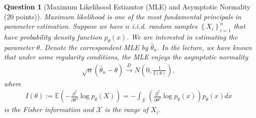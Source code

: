 \documentclass[11pt]{article}
\theoremstyle{mytheoremstyle}
\newtheorem{question}{Question}
\begin{document}
\begin{question}[Maximum Likelihood Estiamtor (MLE) and Asymptotic Normality (20 points)]
Maximum likelihood is one of the most fundamental principals in parameter estimation. Suppose we have $n$ i.i.d. random samples $\left\{X_i\right\}_{i=1}^n$ that have probability density function $p_\theta(x)$. We are interested in estimating the parameter $\theta$. Denote the correspondent MLE by $\hat \theta_n$. In the lecture, we have known that under some regularity conditions, the MLE enjoys the asymptotic normality
\begin{align}
\sqrt n (\hat \theta_n-\theta)\overset{D}\longrightarrow N(0,\frac{1}{I(\theta)}),
\end{align}
where
\begin{align*}
I(\theta):=\mathbb{E}\left(-\frac{\partial^2}{\partial \theta^2}\log p_\theta(X)\right)
=-\int_{\mathcal X}\left(\frac{\partial^2}{\partial \theta^2}\log p_\theta(x)\right)p_\theta(x)dx
\end{align*}
is the Fisher information and $\mathcal{X}$ is the range of $X_i$.
\end{question}



\end{document}
